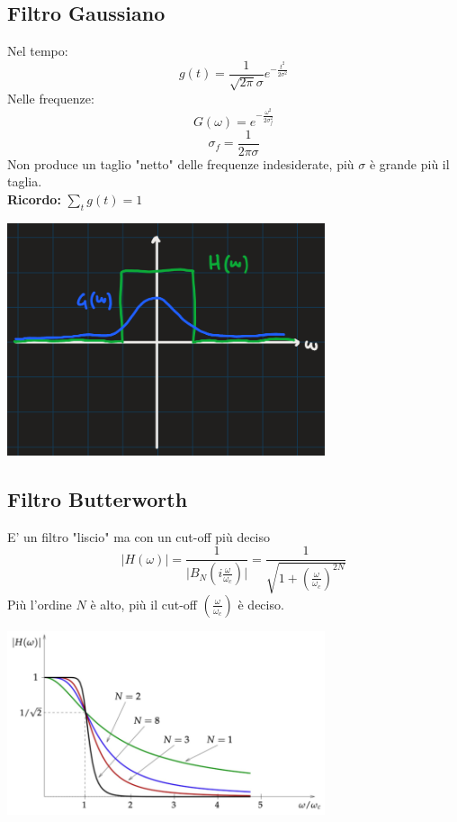 \documentclass[12pt, a4paper]{report}
\begin{document}
\subsection{Filtro Gaussiano}
Nel tempo:
\begin{equation*}
    g(t)=\frac{1}{\sqrt{2\pi}\sigma}e^{-\frac{t^{2}}{2\sigma^{2}}}
\end{equation*}
Nelle frequenze:
\begin{equation*}
    G(\omega)=e^{-\frac{\omega^{2}}{2\sigma^{2}_{f}}}
\end{equation*}
\begin{equation*}
    \sigma_{f}=\frac{1}{2\pi\sigma}
\end{equation*}
Non produce un taglio "netto" delle frequenze indesiderate, più $\sigma$ è grande più il taglia.\\
\textbf{Ricordo:} $\sum_{t}g(t)=1$
\begin{center}
    \includegraphics[width=0.7\textwidth]{Immagini/filtrogaussiano.png}
\end{center}
\subsection{Filtro Butterworth}
E' un filtro "liscio" ma con un cut-off più deciso
\begin{equation*}
    \lvert H(\omega) \rvert = \frac{1}{\lvert  B_{N}(i\frac{\omega}{\omega_{c}}) \rvert} = \frac{1}{\sqrt{1+\left(\frac{\omega}{\omega_{c}}\right)^{2N}}}
\end{equation*}
Più l'ordine $N$ è alto, più il cut-off $\left(\frac{\omega}{\omega_{c}}\right)$ è deciso.
\begin{center}
    \includegraphics[width=0.7\textwidth]{Immagini/filtroButterworth.png}
\end{center}
\end{document}
